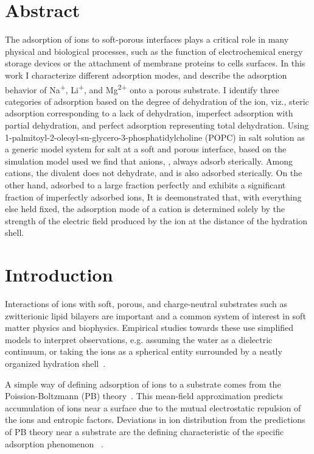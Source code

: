     \section{Abstract}
    The adsorption of ions to soft-porous interfaces plays a critical role in 
    many physical and biological processes, such as the function of electrochemical 
    energy storage devices or 
    the attachment of membrane proteins to cells surfaces. 
    In this work I characterize different adsorption modes, and
    describe the adsorption behavior of Na\textsuperscript{+}, Li\textsuperscript{+}, and Mg\textsuperscript{2+} 
    {onto a porous substrate}.
    I identify three categories of adsorption based on 
    the degree of dehydration of the ion, 
    viz., steric adsorption {corresponding to a lack of dehydration}, 
    imperfect adsorption {with partial dehydration}, and 
    perfect adsorption {representing total dehydration}.
    Using 1-palmitoyl-2-oleoyl-sn-glycero-3-phosphatidylcholine (POPC) 
    in salt solution as a generic model system for salt at a soft and 
    porous interface, based on the simulation model used we find that 
    anions, \cl{}, always adsorb sterically. Among cations, the divalent
    \mg{} does not dehydrate, and is {also} adsorbed sterically. 
    On the other hand, \na{}  
    adsorbed to a large fraction perfectly 
    {and \li{} exhibits a significant fraction of imperfectly adsorbed ions,}
    It is deemonstrated that, with everything else held fixed, the 
    adsorption mode of a cation is determined
    solely by the strength of the electric field produced by the 
    ion at the distance of the hydration shell. 


\section{Introduction}
Interactions of ions with soft, porous, and charge-neutral substrates
such as zwitterionic lipid bilayers are important and a common
system of interest in soft matter physics and biophysics.
Empirical studies towards these use simplified
models to interpret observations, e.g. assuming the water as a
dielectric continuum,
or taking the ions as a spherical entity surrounded
by a neatly organized hydration shell~\cite{israelachvili:2011:intermol}.

A simple way of defining adsorption of ions to a substrate 
comes from the Poission-Boltzmann (PB) theory~\cite{israelachvili:2011:intermol}.
{This mean-field approximation predicts accumulation
of ions near a surface due to the mutual electrostatic repulsion
of the ions and entropic factors.}
{Deviations in ion distribution from the predictions of PB theory near a substrate are
    the defining characteristic of the specific adsorption phenomenon
~\cite{stern:1924:theory,grahame:1947:electrical}.}

